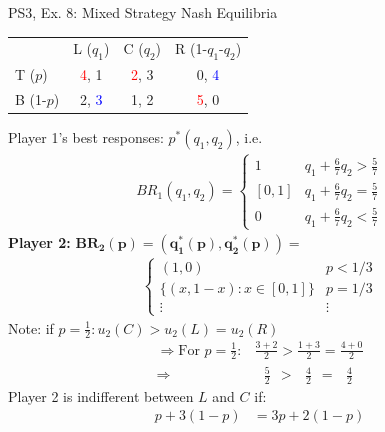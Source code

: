 \begin{frame}{PS3, Ex. 8: Mixed Strategy Nash Equilibria}
  \begin{multicols}{2}
    \begin{table}
      \begin{tabular}{l|c|c|c|}
          \multicolumn{1}{c}{}  & \multicolumn{1}{c}{L ($q_1$)} & \multicolumn{1}{c}{C ($q_2$)} & \multicolumn{1}{c}{R (1-$q_1$-$q_2$)} \\\cline{2-4}
          T ($p$)   & \textcolor{red}{4}, 1 & \textcolor{red}{2}, 3 & 0, \textcolor{blue}{4} \\\cline{2-4}
          B (1-$p$) & 2, \textcolor{blue}{3} & 1, 2 & \textcolor{red}{5}, 0 \\\cline{2-4}
      \end{tabular}
    \end{table}
    Player 1's best responses: $p^{*}(q_1,q_2)$, i.e.
    \begin{align*}
      BR_1(q_1,q_2)=
      \left\{ \begin{array}{ll}
          1                 & q_1 + \frac{6}{7}q_2 > \frac{5}{7}\\
          \left[0,1\right]  & q_1 + \frac{6}{7}q_2 = \frac{5}{7}\\
          0                 & q_1 + \frac{6}{7}q_2 < \frac{5}{7}
      \end{array}\right.
    \end{align*}
    \textbf{Player 2:} $\bm{BR_2(p)=\left(q_1^{*}(p),q_2^{*}(p)\right)}=$
    \begin{align*}
      \left\{ \begin{array}{ll}
          (1,0)                 & p < 1/3 \\
          \{(x,1-x):x\in[0,1]\} & p = 1/3 \\
          \vdots                & \vdots
      \end{array}\right.
    \end{align*}
    Note: if $p=\frac{1}{2}:u_2(C)>u_2(L)=u_2(R)$
    \begin{align*}
      \Rightarrow\text{For }p=\frac{1}{2}:&\frac{3+2}{2}>\frac{1+3}{2}=\frac{4+0}{2}\\
          \Rightarrow&\ \ \ \frac{5}{2}\ \ >\ \ \ \frac{4}{2}\ \ =\ \ \ \frac{4}{2}
    \end{align*}
  \vfill\null \columnbreak
    Player 2 is indifferent between $L$ and $C$ if:
    \begin{align*}
      p+3(1-p)&= 3p + 2(1-p) \\

\end{align*}
\end{multicols}
\end{frame}
